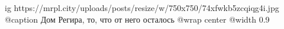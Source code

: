  
 
 
 
 

\ifcmt
  ig https://mrpl.city/uploads/posts/resize/w/750x750/74xfwkb5zcqiqg4i.jpg
	@caption Дом Регира, то, что от него осталось
  @wrap center
  @width 0.9
\fi
